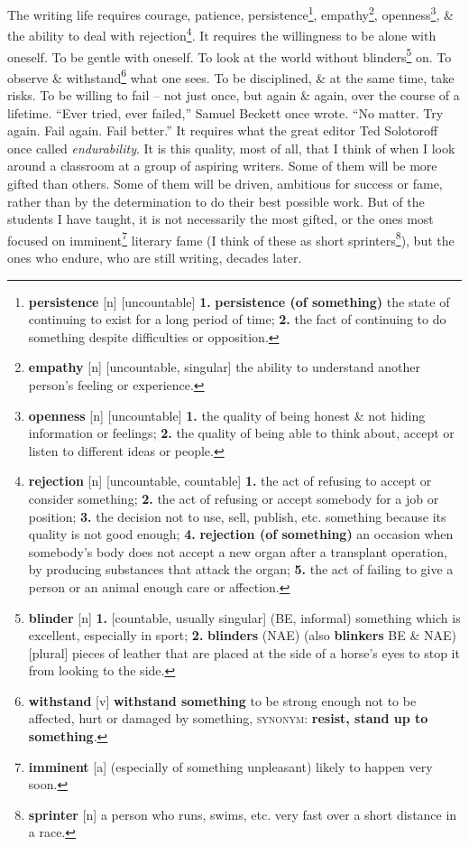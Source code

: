 \documentclass[oneside]{book}
\numberwithin{equation}{section}
\begin{document}
The writing life requires courage, patience, persistence\footnote{\textbf{persistence} [n] [uncountable] \textbf{1.} \textbf{persistence (of something)} the state of continuing to exist for a long period of time; \textbf{2.} the fact of continuing to do something despite difficulties or opposition.}, empathy\footnote{\textbf{empathy} [n] [uncountable, singular] the ability to understand another person's feeling or experience.}, openness\footnote{\textbf{openness} [n] [uncountable] \textbf{1.} the quality of being honest \& not hiding information or feelings; \textbf{2.} the quality of being able to think about, accept or listen to different ideas or people.}, \& the ability to deal with rejection\footnote{\textbf{rejection} [n] [uncountable, countable] \textbf{1.} the act of refusing to accept or consider something; \textbf{2.} the act of refusing or accept somebody for a job or position; \textbf{3.} the decision not to use, sell, publish, etc. something because its quality is not good enough; \textbf{4.} \textbf{rejection (of something)} an occasion when somebody's body does not accept a new organ after a transplant operation, by producing substances that attack the organ; \textbf{5.} the act of failing to give a person or an animal enough care or affection.}. It requires the willingness to be alone with oneself. To be gentle with oneself. To look at the world without blinders\footnote{\textbf{blinder} [n] \textbf{1.} [countable, usually singular] (BE, informal) something which is excellent, especially in sport; \textbf{2.} \textbf{blinders} (NAE) (also \textbf{blinkers} BE \& NAE) [plural] pieces of leather that are placed at the side of a horse's eyes to stop it from looking to the side.} on. To observe \& withstand\footnote{\textbf{withstand} [v] \textbf{withstand something} to be strong enough not to be affected, hurt or damaged by something, \textsc{synonym}: \textbf{resist, stand up to something}.} what one sees. To be disciplined, \& at the same time, take risks. To be willing to fail -- not just once, but again \& again, over the course of a lifetime. ``Ever tried, ever failed,'' Samuel Beckett once wrote. ``No matter. Try again. Fail again. Fail better.'' It requires what the great editor Ted Solotoroff once called \textit{endurability}. It is this quality, most of all, that I think of when I look around a classroom at a group of aspiring writers. Some of them will be more gifted than others. Some of them will be driven, ambitious for success or fame, rather than by the determination to do their best possible work. But of the students I have taught, it is not necessarily the most gifted, or the ones most focused on imminent\footnote{\textbf{imminent} [a] (especially of something unpleasant) likely to happen very soon.} literary fame (I think of these as short sprinters\footnote{\textbf{sprinter} [n] a person who runs, swims, etc. very fast over a short distance in a race.}), but the ones who endure, who are still writing, decades later.
\end{document}
